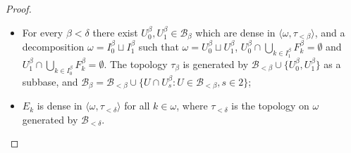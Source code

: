\documentclass[12pt,a4paper]{amsart}
\theoremstyle{definition}
\newcommand{\w}{\omega}
\newcommand{\B}{\mathcal{B}}
\newcommand{\CG}{\mathcal{G}}
\newcommand{\la}{\langle}
\newcommand{\ra}{\rangle}
\begin{document}
\begin{proof}
\begin{itemize}
   \begin{itemize}
   \item[$(a)$] $L^\beta_n\in [D^\beta_n]^{<\w}$ for all $n\in\w$;
      \item[$(b)$] For every  $U\in\B_{<\delta}:=\bigcup_{\beta<\delta}\B_\beta $
   there exists $G=G_{\beta,U}\in\CG$ such that
   $$\lim_{n\to\infty,n\in G}|L^\beta_n\cap U|=\infty;$$
   \item[$(c)$] Moreover, for every $U\in\B_{<\delta}$, if 
   $|\{k\in\w:D^\beta_n\cap U\cap E_k\neq\emptyset\}|=\w$
      for all $n\in\w$, {then 
   $$\lim_{n\to\infty,n\in G}|\{k\in\w: L^\beta_n\cap U\cap E_k\neq\emptyset\}|=\infty.$$} In this case for all $n\in G_{\beta,U}$ we set\\ $K^{\beta,U}_n=\{k\in\w: L^\beta_n\cap U\cap E_k\neq\emptyset\}$;
    \end{itemize}
\item[$(4)$] For every $\beta<\delta$ there exist $U^\beta_0, U^\beta_1\in\B_\beta$ which are dense in $\la\w,\tau_{<\beta}\ra$, and a decomposition $\w=I^\beta_0\sqcup I^\beta_1$ such that $\w=U^\beta_0\sqcup U^\beta_1$,
$U^\beta_0\cap\bigcup_{k\in I^\beta_1}F^\beta_k=\emptyset$ and
$U^\beta_1\cap\bigcup_{k\in I^\beta_0}F^\beta_k=\emptyset$.
The topology $\tau_\beta$ is generated by $\B_{<\beta}\cup\{U^\beta_0,U^\beta_1\}$ as a subbase,
and $\B_\beta=\B_{<\beta}\cup\{U\cap U^\beta_s:U\in\B_{<\beta}, s\in 2\}$;
\item[$(5)$] $E_k$ is dense in $\la \w,\tau_{<\delta}\ra$
for all $k\in\w$, {where $\tau_{<\delta}$ is the topology on $\w$ generated by $\B_{<\delta}$}.
\end{itemize}


\end{proof}
\end{document}

